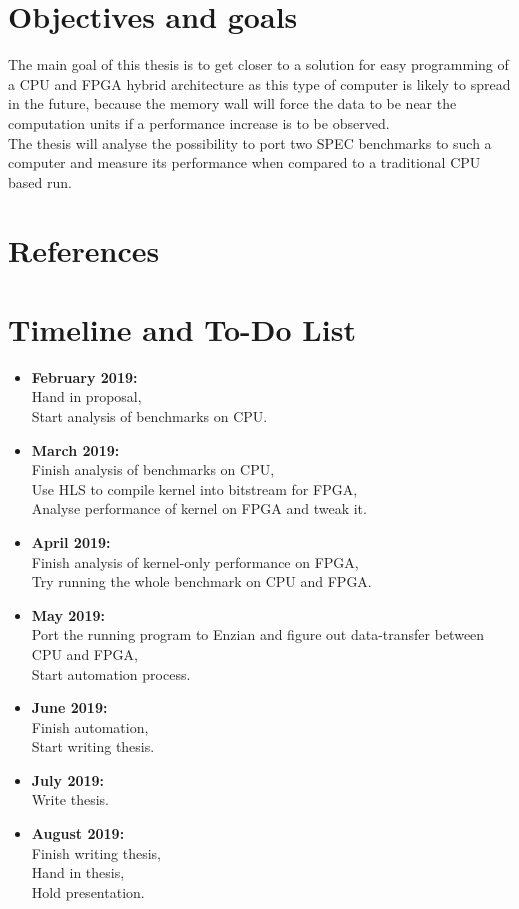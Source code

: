 \documentclass[12pt]{article}
\begin{document}
\section*{Objectives and goals}
The main goal of this thesis is to get closer to a solution for easy programming of a CPU and FPGA hybrid architecture as this type of computer is likely to spread in the future, because the memory wall will force the data to be near the computation units if a performance increase is to be observed.\\
The thesis will analyse the possibility to port two SPEC benchmarks to such a computer and measure its performance when compared to a traditional CPU based run.
\section*{References}

\newpage
\section*{Timeline and To-Do List}
\begin{itemize}
\item \textbf{February 2019:}\\
Hand in proposal,\\
Start analysis of benchmarks on CPU.
\item \textbf{March 2019:}\\
Finish analysis of benchmarks on CPU,\\
Use HLS to compile kernel into bitstream for FPGA,\\
Analyse performance of kernel on FPGA and tweak it.
\item \textbf{April 2019:}\\
Finish analysis of kernel-only performance on FPGA,\\
Try running the whole benchmark on CPU and FPGA.
\item \textbf{May 2019:}\\
Port the running program to Enzian and figure out data-transfer between CPU and FPGA,\\
Start automation process.
\item \textbf{June 2019:}\\ 
Finish automation,\\
Start writing thesis.
\item \textbf{July 2019:}\\
Write thesis.
\item \textbf{August 2019:}\\
Finish writing thesis,\\
Hand in thesis,\\
Hold presentation.
\end{itemize}
\end{document}
